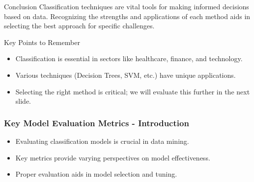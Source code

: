 \documentclass[aspectratio=169]{beamer}
\begin{document}
\begin{frame}[fragile]{Conclusion}
    Classification techniques are vital tools for making informed decisions based on data. Recognizing the strengths and applications of each method aids in selecting the best approach for specific challenges.
\end{frame}

\begin{frame}[fragile]{Key Points to Remember}
    \begin{itemize}
        \item Classification is essential in sectors like healthcare, finance, and technology.
        \item Various techniques (Decision Trees, SVM, etc.) have unique applications.
        \item Selecting the right method is critical; we will evaluate this further in the next slide.
    \end{itemize}
\end{frame}

\begin{frame}[fragile]
    \frametitle{Key Model Evaluation Metrics - Introduction}
    \begin{itemize}
        \item Evaluating classification models is crucial in data mining.
        \item Key metrics provide varying perspectives on model effectiveness.
        \item Proper evaluation aids in model selection and tuning.
    \end{itemize}
\end{frame}
\end{document}
